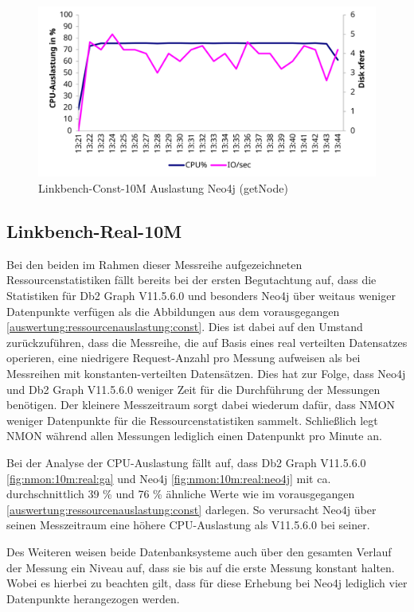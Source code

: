 \begin{figure}[!ht]
    \centering
    \includegraphics[width=\textwidth]{images/stats/linkbench-10m-const_neo4j.pdf}
    \caption{Linkbench-Const-10M Auslastung Neo4j (getNode)}
    \label{fig:nmon:10m:const:neo4j}
\end{figure}

\subsection{Linkbench-Real-10M}
\label{auswertung:ressourcenauslastung:real}
Bei den beiden im Rahmen dieser Messreihe aufgezeichneten Ressourcenstatistiken fällt bereits bei der ersten Begutachtung auf, dass die Statistiken für Db2 Graph V11.5.6.0 und besonders Neo4j über weitaus weniger Datenpunkte verfügen als die Abbildungen aus dem vorausgegangen \autoref{auswertung:ressourcenauslastung:const}. Dies ist dabei auf den Umstand zurückzuführen, dass die Messreihe, die auf Basis eines real verteilten Datensatzes operieren, eine niedrigere Request-Anzahl pro Messung aufweisen als bei Messreihen mit konstanten-verteilten Datensätzen. Dies hat zur Folge, dass Neo4j und Db2 Graph V11.5.6.0 weniger Zeit für die Durchführung der Messungen benötigen. Der kleinere Messzeitraum sorgt dabei wiederum dafür, dass NMON weniger Datenpunkte für die Ressourcenstatistiken sammelt. Schließlich legt NMON während allen Messungen lediglich einen Datenpunkt pro Minute an. 

Bei der Analyse der CPU-Auslastung fällt auf, dass Db2 Graph V11.5.6.0 \autoref{fig:nmon:10m:real:ga} und Neo4j \autoref{fig:nmon:10m:real:neo4j} mit ca. durchschnittlich 39 \% und 76 \% ähnliche Werte wie im vorausgegangen \autoref{auswertung:ressourcenauslastung:const} darlegen. So verursacht Neo4j über seinen Messzeitraum eine höhere CPU-Auslastung als V11.5.6.0 bei seiner.   

Des Weiteren weisen beide Datenbanksysteme auch über den gesamten Verlauf der Messung ein Niveau auf, dass sie bis auf die erste Messung konstant halten. Wobei es hierbei zu beachten gilt, dass für diese Erhebung bei Neo4j lediglich vier Datenpunkte herangezogen werden.

